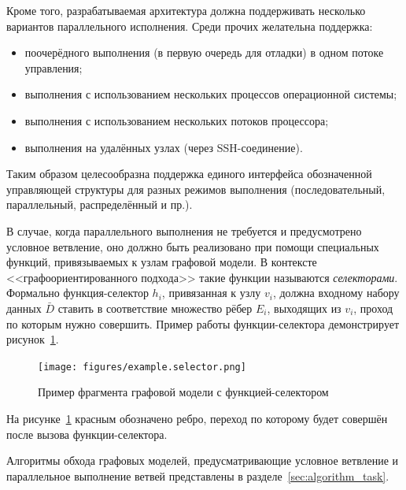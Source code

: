 Кроме того, разрабатываемая архитектура должна поддерживать несколько вариантов параллельного исполнения. Среди прочих желательна поддержка:
\begin{itemize}
    \item поочерёдного выполнения (в первую очередь для отладки) в одном потоке управления;
    \item выполнения с использованием нескольких процессов операционной системы;
    \item выполнения с использованием нескольких потоков процессора;
    \item выполнения на удалённых узлах (через SSH-соединение).
\end{itemize}

Таким образом целесообразна поддержка единого интерфейса обозначенной управляющей структуры для разных режимов выполнения (последовательный, параллельный, распределённый и пр.).

В случае, когда параллельного выполнения не требуется и предусмотрено условное ветвление, оно должно быть реализовано при помощи специальных функций, привязываемых к узлам графовой модели. В контексте <<графоориентированного подхода>> такие функции называются \emph{селекторами}. Формально функция-селектор $h_i$, привязанная к узлу $v_i$, должна входному набору данных $\bar{D}$ ставить в соответствие множество рёбер $E_i$, выходящих из $v_i$, проход по которым нужно совершить. Пример работы функции-селектора демонстрирует рисунок~\ref{fig:graphSelector}.

\begin{figure}[H]
    \centering
    \texttt{[image: figures/example.selector.png]}
    \caption{Пример фрагмента графовой модели с функцией-селектором}
    \label{fig:graphSelector}
\end{figure}

На рисунке~\ref{fig:graphSelector} красным обозначено ребро, переход по которому будет совершён после вызова функции-селектора.

Алгоритмы обхода графовых моделей, предусматривающие условное ветвление и параллельное выполнение ветвей представлены в разделе~\ref{sec:algorithm_task}.
